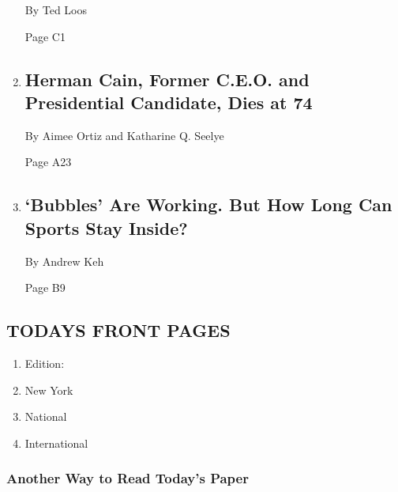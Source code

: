 \begin{enumerate}
  By Ted Loos

  Page C1
\item
  \href{/2020/07/30/us/politics/herman-cain-dead.html}{}

  \hypertarget{herman-cain-former-ceo-and-presidential-candidate-dies-at-74}{%
  \subsection{Herman Cain, Former C.E.O. and Presidential Candidate,
  Dies at
  74}\label{herman-cain-former-ceo-and-presidential-candidate-dies-at-74}}

  By Aimee Ortiz and Katharine Q. Seelye

  Page A23
\item
  \href{/2020/07/30/sports/basketball/sports-bubble-nba-mlb.html}{}

  \hypertarget{bubbles-are-working-but-how-long-can-sports-stay-inside}{%
  \subsection{`Bubbles' Are Working. But How Long Can Sports Stay
  Inside?}\label{bubbles-are-working-but-how-long-can-sports-stay-inside}}

  By Andrew Keh

  Page B9
\end{enumerate}

\hypertarget{todays-front-pages}{%
\subsection{TODAYS FRONT PAGES}\label{todays-front-pages}}

\begin{enumerate}
\def\labelenumi{\arabic{enumi}.}
\tightlist
\item
  Edition:
\item
  New York
\item
  National
\item
  International
\end{enumerate}

\href{http://app.nytimes.com/todayspaper}{}

\hypertarget{another-way-to-read-todays-paper}{%
\subsubsection{Another Way to Read Today's
Paper}\label{another-way-to-read-todays-paper}}

